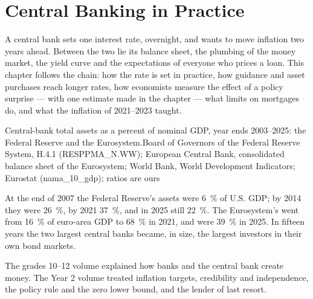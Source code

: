 \chapter{Central Banking in Practice}\label{ch:b3:central-banking}

A central bank sets one interest rate, overnight, and wants to move inflation two
years ahead. Between the two lie its balance sheet, the plumbing of the money
market, the yield curve and the expectations of everyone who prices a loan. This
chapter follows the chain: how the rate is set in practice, how guidance and asset
purchases reach longer rates, how economists measure the effect of a policy
surprise --- with one estimate made in the chapter --- what limits on mortgages do,
and what the inflation of 2021--2023 taught.

\begin{openingchart}{Central-bank total assets as a percent of nominal GDP, year
ends 2003--2025: the Federal Reserve and the Eurosystem.}{Board of Governors of the
Federal Reserve System, H.4.1 (RESPPMA\_N.WW); European Central Bank, consolidated
balance sheet of the Eurosystem; World Bank, World Development Indicators; Eurostat
(nama\_10\_gdp); ratios are ours}
\end{openingchart}

At the end of 2007 the Federal Reserve's assets were 6~\% of U.S. GDP; by 2014 they were
26~\%, by 2021 37~\%, and in 2025 still 22~\%. The Eurosystem's went from 16~\% of
euro-area GDP to 68~\% in 2021, and were 39~\% in 2025. In fifteen years the two
largest central banks became, in size, the largest investors in their own bond
markets.

\begin{recall}
The grades 10--12 volume explained how banks and the central bank create money.
The Year 2 volume treated inflation targets, credibility and independence, the
policy rule and the zero lower bound, and the lender of last resort.
\end{recall}

